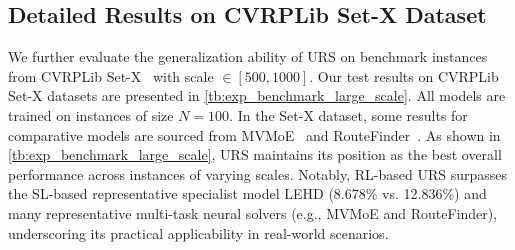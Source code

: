 \documentclass{article}
\theoremstyle{plain}
\theoremstyle{definition}
\theoremstyle{remark}
\begin{document}
\subsection{Detailed Results on CVRPLib Set-X Dataset}
\label{append:benchmark}
We further evaluate the generalization ability of URS on benchmark instances from CVRPLib Set-X~\citep{uchoa2017cvrplib_setx} with scale $\in [500,1000]$. Our test results on CVRPLib Set-X datasets are presented in \cref{tb:exp_benchmark_large_scale}. All models are trained on instances of size $N = 100$. In the Set-X dataset, some results for comparative models are sourced from MVMoE~\citep{zhou2024mvmoe} and RouteFinder~\citep{berto2024routefinder}. As shown in \cref{tb:exp_benchmark_large_scale}, URS maintains its position as the best overall performance across instances of varying scales. Notably, RL-based URS surpasses the SL-based representative specialist model LEHD (8.678\% vs. 12.836\%) and many representative multi-task neural solvers (e.g., MVMoE and RouteFinder), underscoring its practical applicability in real-world scenarios. 
\end{document}
